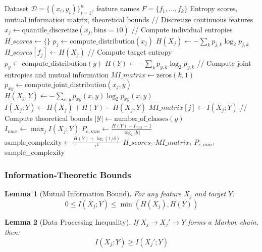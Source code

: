 \documentclass[journal]{IEEEtran}
\newtheorem{lemma}{Lemma}
\begin{document}
\begin{algorithm}[H]
\caption{Complete Information-Theoretic Analysis}
\label{alg:info_complete}
\begin{algorithmic}[1]
\REQUIRE Dataset $\mathcal{D} = \{(x_i, y_i)\}_{i=1}^n$, feature names $F = \{f_1, \ldots, f_k\}$
\ENSURE Entropy scores, mutual information matrix, theoretical bounds
\STATE // Discretize continuous features
    \STATE $x_j \leftarrow \text{quantile\_discretize}(x_j, \text{bins}=10)$
\ENDFOR
\STATE // Compute individual entropies
\STATE $H\_scores \leftarrow \{\}$
    \STATE $p_j \leftarrow \text{compute\_distribution}(x_j)$
    \STATE $H(X_j) \leftarrow -\sum_k p_{j,k} \log_2 p_{j,k}$
    \STATE $H\_scores[f_j] \leftarrow H(X_j)$
\ENDFOR
\STATE // Compute target entropy
\STATE $p_y \leftarrow \text{compute\_distribution}(y)$
\STATE $H(Y) \leftarrow -\sum_k p_{y,k} \log_2 p_{y,k}$
\STATE // Compute joint entropies and mutual information
\STATE $MI\_matrix \leftarrow \text{zeros}(k, 1)$
    \STATE $p_{xy} \leftarrow \text{compute\_joint\_distribution}(x_j, y)$
    \STATE $H(X_j, Y) \leftarrow -\sum_{x,y} p_{xy}(x,y) \log_2 p_{xy}(x,y)$
    \STATE $I(X_j; Y) \leftarrow H(X_j) + H(Y) - H(X_j, Y)$
    \STATE $MI\_matrix[j] \leftarrow I(X_j; Y)$
\ENDFOR
\STATE // Compute theoretical bounds
\STATE $|\mathcal{Y}| \leftarrow \text{number\_of\_classes}(y)$
\STATE $I_{max} \leftarrow \max_j I(X_j; Y)$
\STATE $P_{e,min} \leftarrow \frac{H(Y) - I_{max} - 1}{\log_2 |\mathcal{Y}|}$
\STATE $\text{sample\_complexity} \leftarrow \frac{H(Y) + \log(1/\delta)}{\epsilon^2}$
\RETURN $H\_scores$, $MI\_matrix$, $P_{e,min}$, sample\_complexity
\end{algorithmic}
\end{algorithm}

\subsubsection{Information-Theoretic Bounds}

\begin{lemma}[Mutual Information Bound]
For any feature $X_j$ and target $Y$:
$$0 \leq I(X_j; Y) \leq \min(H(X_j), H(Y))$$
\end{lemma}

\begin{lemma}[Data Processing Inequality]
If $X_j \rightarrow X_j' \rightarrow Y$ forms a Markov chain, then:
$$I(X_j; Y) \geq I(X_j'; Y)$$
\end{lemma}
\end{document}
